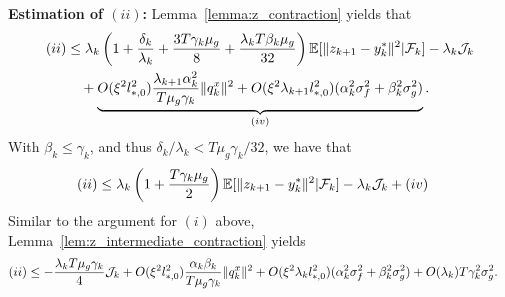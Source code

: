 \textbf{Estimation of $(ii)$: }
Lemma~\ref{lemma:z_contraction} yields that 
\begin{align*}
    (ii) &\le \lambda_k \left(1 + \frac{\delta_k}{\lambda_k} + \frac{3T\gamma_k\mu_g}{8} + \frac{\lambda_k T \beta_k \mu_g }{32}  \right) \mathbb{E}[\|z_{k+1} - y_k^*\|^2 | \mathcal{F}_k ] - \lambda_k \mathcal{J}_k \\
    &\quad + \underbrace{O(\xi^2 l_{*,0}^2) \frac{\lambda_{k+1} \alpha_k^2}{T \mu_g  \gamma_k} \|q_k^x\|^2 + O(\xi^2  \lambda_{k+1} l_{*,0}^2) (\alpha_k^2 \sigma_f^2 + \beta_k^2 \sigma_g^2)}_{(iv)}.
\end{align*}
With $\beta_k \le \gamma_k$, and thus $\delta_k / \lambda_k < T\mu_g \gamma_k / 32$, we have that 
\begin{align*}
    (ii) &\le \lambda_k \left(1 + \frac{T\gamma_k\mu_g}{2} \right) \mathbb{E}[\|z_{k+1} - y_k^*\|^2 | \mathcal{F}_k ] - \lambda_k \mathcal{J}_k + (iv)
\end{align*}
Similar to the argument for $(i)$ above, Lemma~\ref{lem:z_intermediate_contraction} yields
\begin{align*}
    (ii) &\le - \frac{\lambda_k T \mu_g \gamma_k}{4} \mathcal{J}_k + O(\xi^2 l_{*,0}^2) \frac{\alpha_k \beta_k}{T \mu_g \gamma_k} \|q_k^x\|^2 + O(\xi^2 \lambda_k l_{*,0}^2)  (\alpha_k^2 \sigma_f^2 + \beta_k^2 \sigma_g^2) + O(\lambda_k) T\gamma_k^2 \sigma_g^2.
\end{align*}





\medskip

